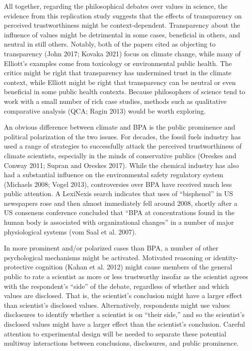 \documentclass[
  letterpaper,
  DIV=11,
  numbers=noendperiod]{scrartcl}
\begin{document}
All together, regarding the philosophical debates over values in
science, the evidence from this replication study suggests that the
effects of transparency on perceived trustworthiness might be
context-dependent. Transparency about the influence of values might be
detrimental in some cases, beneficial in others, and neutral in still
others. Notably, both of the papers cited as objecting to transparency
(John 2017; Kovaka 2021) focus on climate change, while many of
Elliott's examples come from toxicology or environmental public health.
The critics might be right that transparency has undermined trust in the
climate context, while Elliott might be right that transparency can be
neutral or even beneficial in some public health contexts. Because
philosophers of science tend to work with a small number of rich case
studies, methods such as qualitative comparative analysis (QCA; Ragin
2013) would be worth exploring.

An obvious difference between climate and BPA is the public prominence
and political polarization of the two issues. For decades, the fossil
fuels industry has used a range of strategies to successfully attack the
perceived trustworthiness of climate scientists, especially in the minds
of conservative publics (Oreskes and Conway 2011; Supran and Oreskes
2017). While the chemical industry has also had a substantial influence
on the environmental safety regulatory system (Michaels 2008; Vogel
2013), controversies over BPA have received much less public attention.
A LexiNexis search indicates that uses of ``bisphenol'' in US newspapers
rose and then almost immediately fell around 2008, shortly after a US
consensus conference concluded that ``BPA at concentrations found in the
human body is associated with organizational changes'' in a number of
major physiological systems (vom Saal et al. 2007).

In more prominent and/or polarized cases than BPA, a number of other
psychological mechanisms might be activated. Motivated reasoning or
identity-protective cognition (Kahan et al. 2012) might cause members of
the general public to rate a scientist as more or less trustworthy
insofar as the scientist agrees with the respondent's ``side'' of the
debate, regardless of whether and which values are disclosed. That is,
the scientist's conclusion might have a larger effect than scientist's
disclosed values. Alternatively, respondents might use values
disclosures to identify whether a scientist is on ``their side,'' and so
the scientist's disclosed values might have a larger effect than the
scientist's conclusion. Careful attention to experimental design will be
needed to separate these potential multiway interactions between
conclusions, disclosures, and public prominence.
\end{document}
